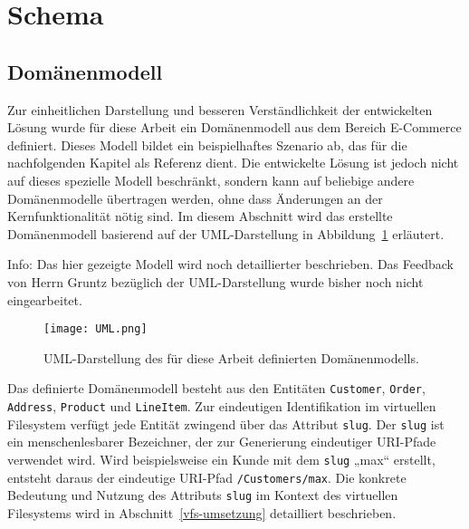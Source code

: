 \section{Schema}



\subsection{Domänenmodell}
Zur einheitlichen Darstellung und besseren Verständlichkeit der entwickelten Lösung wurde für diese Arbeit ein Domänenmodell aus dem Bereich E-Commerce definiert. Dieses Modell bildet ein beispielhaftes Szenario ab, das für die nachfolgenden Kapitel als Referenz dient. Die entwickelte Lösung ist jedoch nicht auf dieses spezielle Modell beschränkt, sondern kann auf beliebige andere Domänenmodelle übertragen werden, ohne dass Änderungen an der Kernfunktionalität nötig sind. Im diesem Abschnitt wird das erstellte Domänenmodell basierend auf der UML-Darstellung in Abbildung~\ref{fig:uml_modell} erläutert.

Info:
Das hier gezeigte Modell wird noch detaillierter beschrieben. Das Feedback von Herrn Gruntz bezüglich der UML-Darstellung wurde bisher noch nicht eingearbeitet.

\begin{figure}[H]
  \centering
  \texttt{[image: UML.png]}
  \caption{UML-Darstellung des für diese Arbeit definierten Domänenmodells.}
  \label{fig:uml_modell}
\end{figure}

Das definierte Domänenmodell besteht aus den Entitäten \texttt{Customer}, \texttt{Order}, \texttt{Address}, \texttt{Product} und \texttt{LineItem}. Zur eindeutigen Identifikation im virtuellen Filesystem verfügt jede Entität zwingend über das Attribut \texttt{slug}. Der \texttt{slug} ist ein menschenlesbarer Bezeichner, der zur Generierung eindeutiger URI-Pfade verwendet wird. Wird beispielsweise ein Kunde mit dem \texttt{slug} „max“ erstellt, entsteht daraus der eindeutige URI-Pfad \texttt{/Customers/max}. Die konkrete Bedeutung und Nutzung des Attributs \texttt{slug} im Kontext des virtuellen Filesystems wird in Abschnitt~\ref{vfs-umsetzung} detailliert beschrieben.